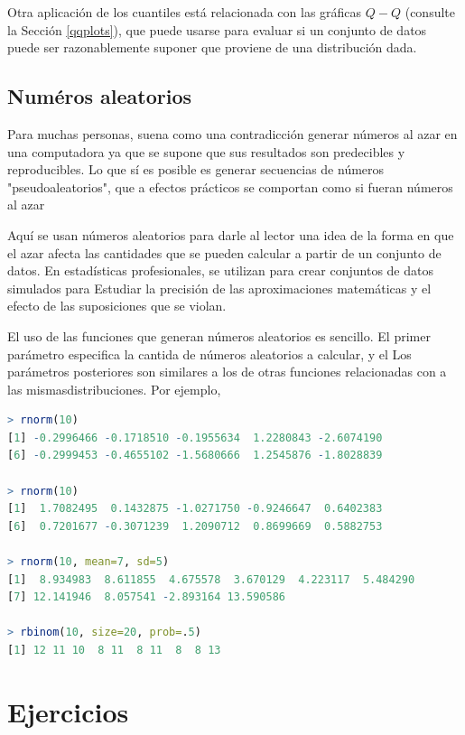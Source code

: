 Otra aplicación de los cuantiles está relacionada con las gráficas $Q - Q$
(consulte la Sección \ref{qqplots}), que puede usarse para evaluar si un
conjunto de datos puede ser razonablemente suponer que proviene de una
distribución dada.

\subsection{Numéros aleatorios}

Para muchas personas, suena como una contradicción generar números al azar en
una computadora ya que se supone que sus resultados son predecibles y
reproducibles. Lo que sí es posible es generar secuencias de números
"pseudoaleatorios", que a efectos prácticos se comportan como si fueran números
al azar

Aquí se usan números aleatorios para darle al lector una idea de la forma en que
el azar afecta las cantidades que se pueden calcular a partir de un conjunto de
datos. En estadísticas profesionales, se utilizan para crear conjuntos de datos
simulados para Estudiar la precisión de las aproximaciones matemáticas y el
efecto de las suposiciones que se violan.

El uso de las funciones que generan números aleatorios es sencillo. El primer
parámetro especifica la cantida de números aleatorios a calcular, y el Los
parámetros posteriores son similares a los de otras funciones relacionadas con
a las mismasdistribuciones. Por ejemplo,

\begin{lstlisting}[language=R]
> rnorm(10)
[1] -0.2996466 -0.1718510 -0.1955634  1.2280843 -2.6074190
[6] -0.2999453 -0.4655102 -1.5680666  1.2545876 -1.8028839

> rnorm(10)
[1]  1.7082495  0.1432875 -1.0271750 -0.9246647  0.6402383
[6]  0.7201677 -0.3071239  1.2090712  0.8699669  0.5882753

> rnorm(10, mean=7, sd=5)
[1]  8.934983  8.611855  4.675578  3.670129  4.223117  5.484290
[7] 12.141946  8.057541 -2.893164 13.590586

> rbinom(10, size=20, prob=.5)
[1] 12 11 10  8 11  8 11  8  8 13
\end{lstlisting}

\section{Ejercicios}

